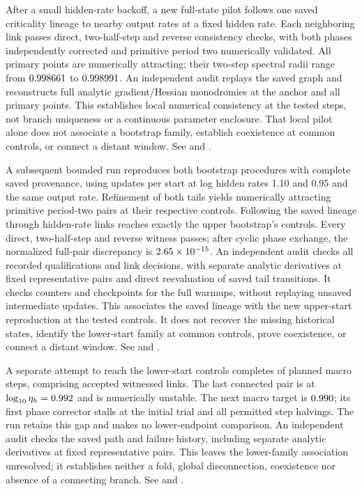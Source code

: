 \documentclass[11pt,letterpaper]{article}
\begin{document}
After a small hidden-rate backoff, a new full-state pilot follows one saved criticality lineage to \nSOneRLocalPoints{} nearby output rates at a
fixed hidden rate. Each neighboring link passes direct, two-half-step and reverse consistency checks, with both
phases independently corrected and primitive period two numerically validated. All primary points are
numerically attracting; their two-step spectral radii range from $0.998661$ to
$0.998991$. An independent audit replays the saved graph and reconstructs full analytic
gradient/Hessian monodromies at the anchor and all primary points. This establishes local numerical consistency
at the tested steps, not branch uniqueness or a continuous parameter enclosure. That local pilot alone does not
associate a bootstrap family, establish coexistence at common controls, or connect a distant window. See
 and .

A subsequent bounded run reproduces both bootstrap procedures with complete saved provenance, using
\nSOneRBootstrapUpdates{} updates per start at log hidden rates 1.10 and 0.95 and the same output rate.
Refinement of both tails yields numerically attracting primitive period-two pairs at their respective controls.
Following the saved lineage through \nSOneRBootstrapLinks{} hidden-rate links reaches exactly the upper
bootstrap's controls. Every direct, two-half-step and reverse witness passes; after cyclic phase exchange,
the normalized full-pair discrepancy is $2.65\times10^{-15}$. An independent audit checks all recorded
qualifications and link decisions, with separate analytic derivatives at fixed representative pairs and
direct reevaluation of saved tail transitions. It checks counters and checkpoints for the full warmups,
without replaying unsaved intermediate updates. This associates the saved lineage with the new upper-start
reproduction at the tested controls. It does not recover the missing historical states, identify the
lower-start family at common controls, prove coexistence, or connect a distant window. See
 and .

A separate attempt to reach the lower-start controls completes \nSOneRLowerCompleted{} of
\nSOneRLowerPlanned{} planned macro steps, comprising \nSOneRLowerLinks{} accepted witnessed links.
The last connected pair is at $\log_{10}\eta_h=0.992$ and is numerically unstable.
The next macro target is $0.990$; its first phase corrector stalls at the initial trial
and all \nSOneRLowerHalvings{} permitted step halvings. The run retains this gap and makes no lower-endpoint comparison.
An independent audit checks the saved path and failure history, including separate analytic derivatives at
fixed representative pairs. This leaves the lower-family association unresolved; it establishes neither
a fold, global disconnection, coexistence nor absence of a connecting branch. See
 and .
\end{document}
